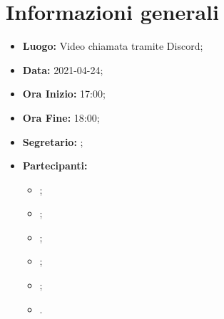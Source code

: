 \section{Informazioni generali}
	\begin{itemize}
		\item \textbf{Luogo:} Video chiamata tramite Discord;
		\item \textbf{Data:} 2021-04-24;
		\item \textbf{Ora Inizio:} 17:00;
		\item \textbf{Ora Fine:} 18:00;
		\item \textbf{Segretario:} \FD ;
		\item \textbf{Partecipanti:}
		\begin{itemize}
			\item \MB ;
			\item \FD ;
			\item \NM ;
			\item \SB ;
			\item \GB ;
			\item \MDI .
		\end{itemize}
		
	\end{itemize}